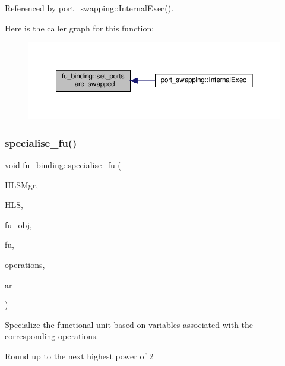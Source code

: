 Referenced by port\+\_\+swapping\+::\+Internal\+Exec().

Here is the caller graph for this function\+:
\nopagebreak
\begin{figure}[H]
\begin{center}
\leavevmode
\includegraphics[width=350pt]{d8/d04/classfu__binding_a04518ec079c3447b876a609b8d3ae288_icgraph}
\end{center}
\end{figure}
\mbox{\label{classfu__binding_ab83a37f707ea824594822564d97060a4}} 
\subsubsection{\texorpdfstring{specialise\+\_\+fu()}{specialise\_fu()}}
{\footnotesize\ttfamily void fu\+\_\+binding\+::specialise\+\_\+fu (\begin{DoxyParamCaption}\item[{const \hyperlink{hls__manager_8hpp_acd3842b8589fe52c08fc0b2fcc813bfe}{H\+L\+S\+\_\+manager\+Ref}}]{H\+L\+S\+Mgr,  }\item[{const \hyperlink{hls_8hpp_a75d0c73923d0ddfa28c4843a802c73a7}{hls\+Ref}}]{H\+LS,  }\item[{\hyperlink{structural__objects_8hpp_a8ea5f8cc50ab8f4c31e2751074ff60b2}{structural\+\_\+object\+Ref}}]{fu\+\_\+obj,  }\item[{unsigned int}]{fu,  }\item[{const \hyperlink{classOpVertexSet}{Op\+Vertex\+Set} \&}]{operations,  }\item[{unsigned int}]{ar }\end{DoxyParamCaption})}



Specialize the functional unit based on variables associated with the corresponding operations. 

Round up to the next highest power of 2

